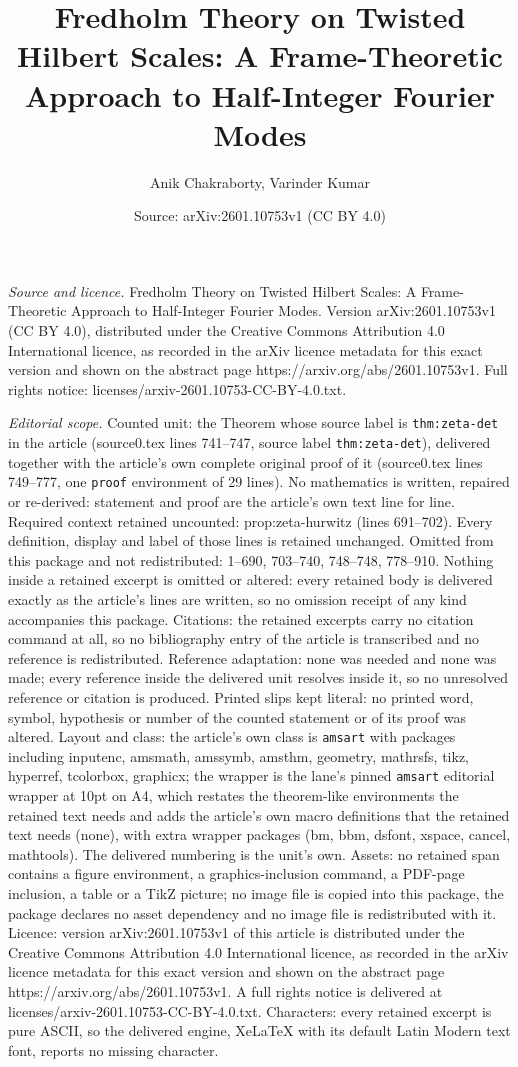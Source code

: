 \documentclass[10pt,a4paper]{amsart}
\title[Fredholm Theory on Twisted Hilbert Scales: A Frame-Theoretic]{Fredholm Theory on Twisted Hilbert Scales: A Frame-Theoretic Approach to Half-Integer Fourier Modes}
\author{Anik Chakraborty, Varinder Kumar}
\date{Source: arXiv:2601.10753v1 (CC BY 4.0)}
\begin{document}
\maketitle

\noindent\emph{Source and licence.} Fredholm Theory on Twisted Hilbert Scales: A Frame-Theoretic Approach to Half-Integer Fourier Modes. Version arXiv:2601.10753v1 (CC BY 4.0), distributed under the Creative Commons Attribution 4.0 International licence, as recorded in the arXiv licence metadata for this exact version and shown on the abstract page https://arxiv.org/abs/2601.10753v1. Full rights notice: licenses/arxiv-2601.10753-CC-BY-4.0.txt.\par\smallskip

\noindent\textit{Editorial scope.} Counted unit: the Theorem whose source label is \texttt{thm:zeta-det} in the article (source0.tex lines 741--747, source label \texttt{thm:zeta-det}), delivered together with the article's own complete original proof of it (source0.tex lines 749--777, one \texttt{proof} environment of 29 lines). No mathematics is written, repaired or re-derived: statement and proof are the article's own text line for line. Required context retained uncounted: prop:zeta-hurwitz (lines 691--702). Every definition, display and label of those lines is retained unchanged. Omitted from this package and not redistributed: 1--690, 703--740, 748--748, 778--910. Nothing inside a retained excerpt is omitted or altered: every retained body is delivered exactly as the article's lines are written, so no omission receipt of any kind accompanies this package. Citations: the retained excerpts carry no citation command at all, so no bibliography entry of the article is transcribed and no reference is redistributed. Reference adaptation: none was needed and none was made; every reference inside the delivered unit resolves inside it, so no unresolved reference or citation is produced. Printed slips kept literal: no printed word, symbol, hypothesis or number of the counted statement or of its proof was altered. Layout and class: the article's own class is \texttt{amsart} with packages including inputenc, amsmath, amssymb, amsthm, geometry, mathrsfs, tikz, hyperref, tcolorbox, graphicx; the wrapper is the lane's pinned \texttt{amsart} editorial wrapper at 10pt on A4, which restates the theorem-like environments the retained text needs and adds the article's own macro definitions that the retained text needs (none), with extra wrapper packages (bm, bbm, dsfont, xspace, cancel, mathtools). The delivered numbering is the unit's own. Assets: no retained span contains a figure environment, a graphics-inclusion command, a PDF-page inclusion, a table or a TikZ picture; no image file is copied into this package, the package declares no asset dependency and no image file is redistributed with it. Licence: version arXiv:2601.10753v1 of this article is distributed under the Creative Commons Attribution 4.0 International licence, as recorded in the arXiv licence metadata for this exact version and shown on the abstract page https://arxiv.org/abs/2601.10753v1. A full rights notice is delivered at licenses/arxiv-2601.10753-CC-BY-4.0.txt. Characters: every retained excerpt is pure ASCII, so the delivered engine, XeLaTeX with its default Latin Modern text font, reports no missing character.
\end{document}
